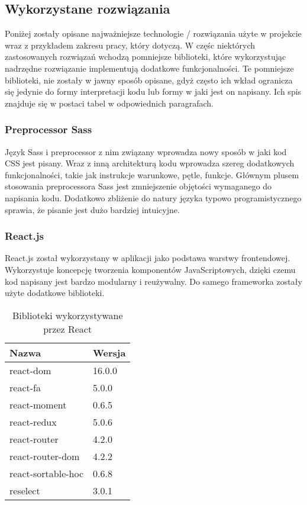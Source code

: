 \documentclass[eng,printmode]{mgr}
\begin{document}
\subsection{Wykorzystane rozwiązania}

Poniżej zostały opisane najważniejsze technologie / rozwiązania użyte w projekcie wraz z przykładem zakresu pracy, który dotyczą. W częśc niektórych zastosowanych rozwiązań wchodzą pomniejsze biblioteki, które wykorzystując nadrzędne rozwiązanie implementują dodatkowe funkcjonalności. Te pomniejsze biblioteki, nie zostały w jawny sposób opisane, gdyż często ich wkład ogranicza się jedynie do formy interpretacji kodu lub formy w jaki jest on napisany. Ich spis znajduje się w postaci tabel w odpowiednich paragrafach.

\subsubsection{Preprocessor Sass}
Język Sass i preprocessor z nim związany \cite{Sass} wprowadza nowy sposób w jaki kod CSS jest pisany. Wraz z inną architekturą kodu wprowadza szereg dodatkowych funkcjonalności, takie jak instrukcje warunkowe, pętle, funkcje. Głównym plusem stosowania preprocessora Sass jest zmniejszenie objętości wymaganego do napisania kodu. Dodatkowo zbliżenie do natury języka typowo programistycznego sprawia, że pisanie jest dużo bardziej intuicyjne.

\subsubsection{React.js}
React.js \cite{React} został wykorzystany w aplikacji jako podstawa warstwy frontendowej. Wykorzystuje koncepcję tworzenia komponentów JavaScriptowych, dzięki czemu kod napisany jest bardzo modularny i reużywalny. Do samego frameworka zostały użyte dodatkowe biblioteki.

\begin{table}[H]
\begin{tabularx}{\textwidth}{|X|X|}
  \hline
    \textbf{Nazwa} & \textbf{Wersja} \\
  \hline
   	react-dom & 16.0.0 \\
  \hline
  	react-fa & 5.0.0 \\
   \hline
   	react-moment & 0.6.5 \\
   \hline
  	react-redux & 5.0.6 \\
   \hline
  	react-router & 4.2.0 \\
   \hline
  	react-router-dom & 4.2.2 \\
   \hline
  	react-sortable-hoc & 0.6.8 \\
   \hline
   reselect & 3.0.1 \\
   \hline
\end{tabularx}
\caption{Biblioteki wykorzystywane przez React}
\end{table}
\end{document}
